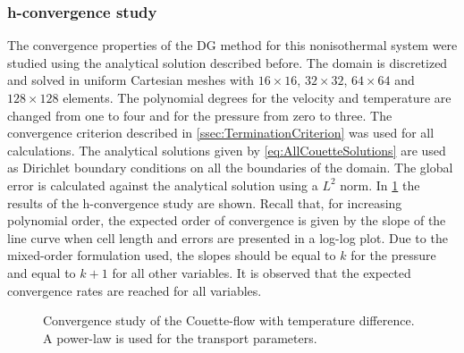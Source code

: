 \subsubsection{h-convergence study}
The convergence properties of the DG method for this nonisothermal system were studied using the analytical solution described before. The domain is discretized and solved in uniform Cartesian meshes with $16\times16$, $32\times32$, $64\times64$ and $128\times128$ elements. The polynomial degrees for the velocity and temperature are changed from one to four and for the pressure from zero to three. The convergence criterion described in \cref{ssec:TerminationCriterion} was used for all calculations. The analytical solutions given by \cref{eq:AllCouetteSolutions} are used as Dirichlet boundary conditions on all the boundaries of the domain. The global error is calculated against the analytical solution using a $L^2$ norm. 
In \cref{fig:ConvergenceCFTD} the results of the h-convergence study are shown.  Recall that, for increasing polynomial order, the expected order of convergence is given by the slope of the line curve when cell length and errors are presented in a log-log plot. Due to the mixed-order formulation used, the slopes should be equal to $k$ for the pressure and equal to $k+1$ for all other variables. It is observed that the expected convergence rates are reached for all variables. 
\begin{figure}[t!]
	\centering
	\pgfplotsset{width=0.34\textwidth, compat=1.3}
	\caption{Convergence study of the Couette-flow with temperature difference. A power-law is used for the transport parameters.}\label{fig:ConvergenceCFTD}
\end{figure}
